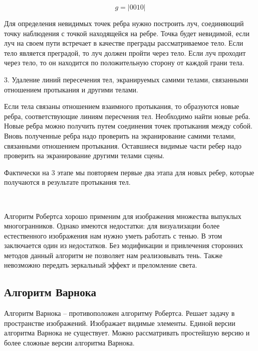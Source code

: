 \begin{equation}
	g = |0010|
	\label{eq:ref3}
\end{equation}

Для определения невидимых точек ребра нужно построить луч, соединяющий точку наблюдения с точкой находящейся на ребре.
Точка будет невидимой, если луч на своем пути встречает в качестве преграды рассматриваемое тело.
Если тело является преградой, то луч должен пройти через тело.
Если луч проходит через тело, то он находится по положительную сторону от каждой грани тела.

3. Удаление линий пересечения тел, экранируемых самими телами, связанными отношением протыкания и другими телами.

Если тела связаны отношением взаимного протыкания, то образуются новые ребра, соответствующие линиям пересчения тел. Необходимо найти новые реба. Новые ребра можно получить путем соединения точек протыкания между собой. Вновь полученные ребра надо проверить на экранирование самими телами, связанными отношением протыкания. Оставшиеся видимые части ребер надо проверить на экранирование другими телами сцены.

Фактически на 3 этапе мы повторяем первые два этапа для новых ребер, которые получаются в результате протыкания тел.

~

Алгоритм Робертса хорошо применим для изображения множества выпуклых многогранников. Однако имеются недостатки: для визуализации более естественного изображения нам нужно уметь работать с тенью. В этом заключается один из недостатков. Без модификации и привлечения сторонних методов данный алгоритм не позволяет нам реализовывать тень. Также невозможно передать зеркальный эффект и преломление света.

\subsection{Алгоритм Варнока}

Алгоритм Варнока -- противоположен алгоритму Робертса. Решает задачу в пространстве изображений. Изображает видимые элементы. Единой версии алгоритма Варнока не существует. Можно рассматривать простейшую версию и более сложные версии алгоритма Варнока.

\begin{figure}[ht!]
\end{figure}

